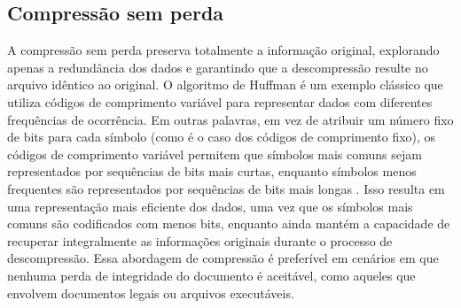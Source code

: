 \begin{figure}[!htbp]
	\centering
\end{figure}

\subsection{Compressão sem perda}
A compressão sem perda preserva totalmente a informação original, explorando apenas a redundância dos dados e garantindo que a descompressão resulte no arquivo idêntico ao original. O algoritmo de Huffman \cite{huffmanArticle} é um exemplo clássico que utiliza códigos de comprimento variável para representar dados com diferentes frequências de ocorrência. Em outras palavras, em vez de atribuir um número fixo de bits para cada símbolo (como é o caso dos códigos de comprimento fixo), os códigos de comprimento variável permitem que símbolos mais comuns sejam representados por sequências de bits mais curtas, enquanto símbolos menos frequentes são representados por sequências de bits mais longas \cite{compressionTechniquesElakkiya}. Isso resulta em uma representação mais eficiente dos dados, uma vez que os símbolos mais comuns são codificados com menos bits, enquanto ainda mantém a capacidade de recuperar integralmente as informações originais durante o processo de descompressão. Essa abordagem de compressão é preferível em cenários em que nenhuma perda de integridade do documento é aceitável, como aqueles que envolvem documentos legais ou arquivos executáveis.

